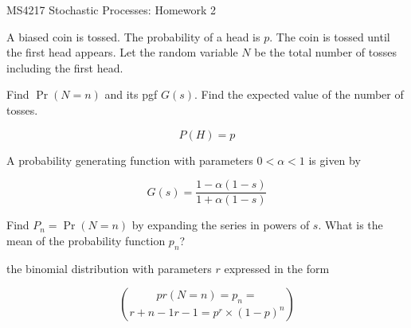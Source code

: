 MS4217 Stochastic Processes: Homework 2

A biased coin is tossed. The probability of a head is $p$. 
The coin is tossed until the first head appears.
Let the random variable $N$ be the total number of tosses including the first head.

Find $\Pr(N=n)$ and its pgf $G(s)$. Find the expected value of the number of tosses.

\[P(H) = p\]

A probability generating function with parameters $0 <\alpha<1$ is given by

\[G(s) = \frac{1-\alpha(1-s)}{1+\alpha(1-s)}\]

Find $P_n= \Pr(N=n)$ by expanding the series in powers of $s$.
What is the mean of the probability function ${p_n}$?

the binomial distribution with parameters $r$ expressed in the form


\[pr(N=n) =p_n= \choose{ {r+n-1} {r-1}}=p^r \times(1-p)^n \]


